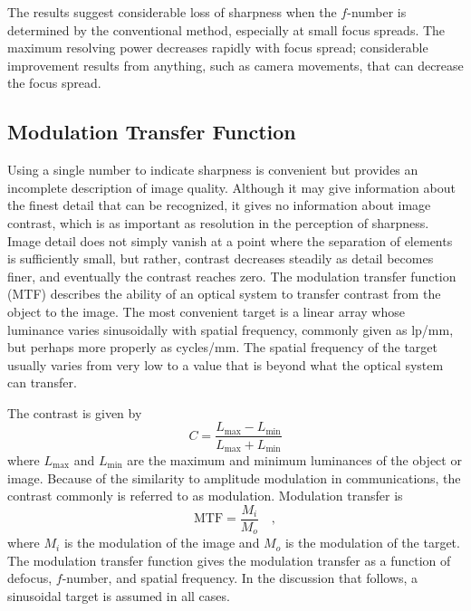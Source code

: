 \documentclass[11pt, oneside]{scrartcl}   	%
\begin{document}
The results suggest considerable loss of sharpness when the $f$-number is determined by the conventional method, especially at small focus spreads. The maximum resolving power decreases rapidly with focus spread; considerable improvement results from anything, such as camera movements, that can decrease the focus spread.
\subsection{Modulation Transfer Function}

Using a single number to indicate sharpness is convenient but provides an incomplete description of image quality. Although it may give information about the finest detail that can be recognized, it gives no information about image contrast, which is as important as resolution in the perception of sharpness. Image detail does not simply vanish at a point where the separation of elements is sufficiently small, but rather, contrast decreases steadily as detail becomes finer, and eventually the contrast reaches zero. The modulation transfer function (MTF) describes the ability of an optical system to transfer contrast from the object to the image. The most convenient target is a linear array whose luminance varies sinusoidally with spatial frequency, commonly given as lp/mm, but perhaps more properly as cycles/mm. The spatial frequency of the target usually varies from very low to a value that is beyond what the optical system can transfer.

The contrast is given by
\begin{equation}
C = \frac{L_\mathrm{max} - L_\mathrm{min}}{L_\mathrm{max} + L_\mathrm{min}}
\end{equation}
where $L_\mathrm{max}$ and $ L_\mathrm{min}$ are the maximum and minimum luminances of the object or image. Because of the similarity to amplitude modulation in communications, the contrast commonly is referred to as modulation. Modulation transfer is
\begin{equation}
\mathrm{MTF} = \frac{M_i}{M_o}\quad,
\end{equation}
where $M_i$ is the modulation of the image and $M_o$ is the modulation of the target. The modulation transfer function gives the modulation transfer as a function of defocus, $f$-number, and spatial frequency. In the discussion that follows, a sinusoidal target is assumed in all cases.
\end{document}
